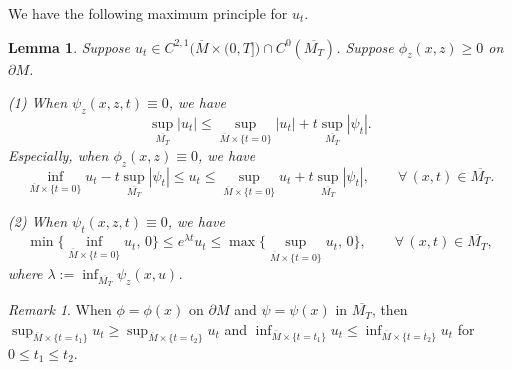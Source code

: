 \documentclass[12pt]{amsart}
\newtheorem{lemma}[theorem]{Lemma}
\theoremstyle{definition}
\theoremstyle{remark}
\newtheorem{remark}[theorem]{Remark}
\numberwithin{equation}{section}
\begin{document}
We have the following maximum principle for $u_t$.
\begin{lemma}\label{u_t_bounds}
	Suppose $u_t \in C^{2, 1}\big(\overline{M}\times (0, T]\big) \cap C^0(\overline{M_T})$. Suppose $\phi_z (x, z) \geq 0$ on $\partial M$.
	
	(1) When $\psi_z (x, z, t) \equiv 0$, we have
	\begin{equation}
	\sup_{\overline{M_T}}|u_t| \leq \sup_{\overline{M}\times \{t=0\}}  |u_t| + t\sup_{\overline{M_T}}|\psi_t|.
	\end{equation}
	Especially, when $\phi_z(x,z) \equiv 0$, we have
	\begin{equation}
	\inf_{\overline{M}\times \{t=0\}} u_t - t\sup_{\overline{M_T}} |\psi_t| \leq u_t \leq \sup_{\overline{M}\times \{t=0\}}  u_t + t\sup_{\overline{M_T}}|\psi_t|, \qquad \forall\,(x, t)\in \overline{M_T}.
	\end{equation}
	
	(2) When $\psi_t (x, z, t) \equiv 0$, we have
	\begin{equation}
	\min\Big\{\inf_{\overline{M}\times \{t=0\}} u_t,\, 0\Big\} \leq e^{\lambda t} u_t \leq \max\Big\{\sup_{\overline{M}\times \{t=0\}} u_t,\, 0\Big\}, \qquad \forall\,(x, t)\in \overline{M_T},
	\end{equation}
	where $\lambda := \inf_{\overline{M_T}}\psi_z(x, u)$.
\end{lemma}
\begin{remark}
	When $\phi = \phi(x)$ on $\partial M$ and $\psi = \psi (x)$ in $\overline{M_T}$, then $\sup_{\overline{M}\times \{t=t_1\}}u_t \geq \sup_{\overline{M}\times \{t=t_2\}}u_t$ and $\inf_{\overline{M}\times \{t=t_1\}}u_t \leq \inf_{\overline{M}\times \{t=t_2\}}u_t$ for $0 \leq t_1 \leq t_2$. 
\end{remark}
\end{document}
